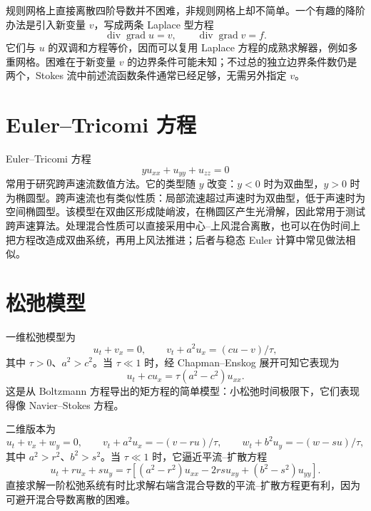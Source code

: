 \documentclass[11pt,a4paper,openany,fontset=none]{ctexbook}
\begin{document}
规则网格上直接离散四阶导数并不困难，非规则网格上却不简单。一个有趣的降阶办法是引入新变量 $v$，写成两条 Laplace 型方程
\begin{equation}
 \operatorname{div}\operatorname{grad}u=v,\qquad
 \operatorname{div}\operatorname{grad}v=f. \tag{2.10.7--8}
\end{equation}
它们与 $u$ 的双调和方程等价，因而可以复用 Laplace 方程的成熟求解器，例如多重网格。困难在于新变量 $v$ 的边界条件可能未知；不过总的独立边界条件数仍是两个，Stokes 流中前述流函数条件通常已经足够，无需另外指定 $v$。

\section{Euler--Tricomi 方程}

Euler--Tricomi 方程
\begin{equation}
 y u_{xx}+u_{yy}+u_{zz}=0 \tag{2.11.1}
\end{equation}
常用于研究跨声速流数值方法。它的类型随 $y$ 改变：$y<0$ 时为双曲型，$y>0$ 时为椭圆型。跨声速流也有类似性质：局部流速超过声速时为双曲型，低于声速时为空间椭圆型。该模型在双曲区形成陡峭波，在椭圆区产生光滑解，因此常用于测试跨声速算法。处理混合性质可以直接采用中心--上风混合离散，也可以在伪时间上把方程改造成双曲系统，再用上风法推进；后者与稳态 Euler 计算中常见做法相似。

\section{松弛模型}

一维松弛模型为
\begin{equation}
 u_t+v_x=0,\qquad v_t+a^2u_x=(cu-v)/\tau, \tag{2.12.1--2}
\end{equation}
其中 $\tau>0$、$a^2>c^2$。当 $\tau\ll1$ 时，经 Chapman--Enskog 展开可知它表现为
\begin{equation}
 u_t+c u_x=\tau(a^2-c^2)u_{xx}. \tag{2.12.3}
\end{equation}
这是从 Boltzmann 方程导出的矩方程的简单模型：小松弛时间极限下，它们表现得像 Navier--Stokes 方程。

二维版本为
\begin{equation}
 u_t+v_x+w_y=0,\qquad
 v_t+a^2u_x=-(v-ru)/\tau,\qquad
 w_t+b^2u_y=-(w-su)/\tau, \tag{2.12.4--6}
\end{equation}
其中 $a^2>r^2$、$b^2>s^2$。当 $\tau\ll1$ 时，它逼近平流--扩散方程
\begin{equation}
 u_t+r u_x+s u_y=\tau\left[(a^2-r^2)u_{xx}-2rsu_{xy}+(b^2-s^2)u_{yy}\right]. \tag{2.12.8}
\end{equation}
直接求解一阶松弛系统有时比求解右端含混合导数的平流--扩散方程更有利，因为可避开混合导数离散的困难。
\end{document}
